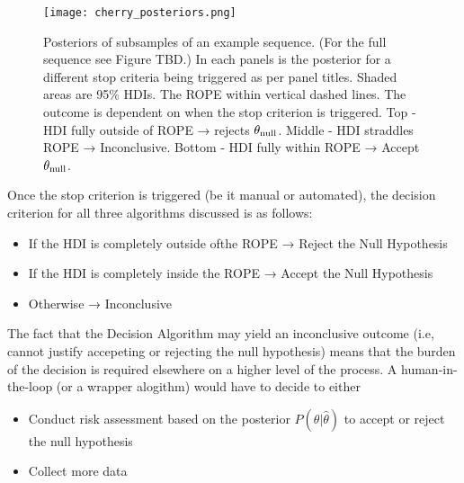 \begin{figure}[h!]
    \centering
    \texttt{[image: cherry\_posteriors.png]}
    \caption{Posteriors of subsamples of an example sequence. (For the full sequence see Figure TBD.)
    In each panels is the posterior for a different stop criteria being triggered as per panel titles.
    Shaded areas are 95\% HDIs. The ROPE within vertical dashed lines.
    The outcome is dependent on when the stop criterion is triggered.
    Top - HDI fully outside of ROPE → rejects $\theta_{\rm null}$.
    Middle - HDI straddles ROPE → Inconclusive.
    Bottom - HDI fully within ROPE → Accept $\theta_{\rm null}$.
    }
    \label{fig:posteriors}
\end{figure}

Once the stop criterion is triggered (be it manual or automated),
the decision criterion for all three algorithms discussed is as follows:

\begin{itemize}
    \item If the HDI is completely outside ofthe ROPE → Reject the Null Hypothesis
    \item If the HDI is completely inside the ROPE → Accept the Null Hypothesis
    \item Otherwise → Inconclusive
\end{itemize}

The fact that the Decision Algorithm may yield an inconclusive outcome
(i.e, cannot justify accepeting or rejecting the null hypothesis) means that the
burden of the decision is required elsewhere on a higher level of the process.
A human-in-the-loop (or a wrapper alogithm) would have to decide to either

\begin{itemize}
    \item Conduct risk assessment based on the posterior $P(\theta|\hat\theta)$ to
    accept or reject the null hypothesis
    \item Collect more data
\end{itemize}

